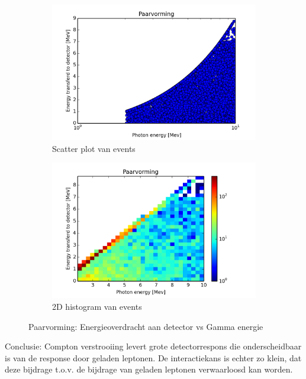 \documentclass[a4paper,11pt]{article}
\begin{document}
\begin{figure}[h]
        \begin{subfigure}[b]{0.6\textwidth}
                \includegraphics[width=1\textwidth]{fig-pair-scatter.png}
                \caption{Scatter plot van events}
                \label{fig:pair-scatter}
        \end{subfigure}
        \begin{subfigure}[b]{0.6\textwidth}
                \includegraphics[width=1\textwidth]{fig-pair-hist2d.png}
                \caption{2D histogram van events}
                \label{fig:pair-hist3d}
        \end{subfigure}
        \caption{Paarvorming: Energieoverdracht aan detector vs Gamma energie}\label{fig:pair}
\end{figure}

Conclusie: Compton verstrooiing levert grote detectorrespons die onderscheidbaar is van de response door geladen leptonen. De interactiekans is echter zo klein, dat deze bijdrage t.o.v. de bijdrage van geladen leptonen verwaarloosd kan worden.
\end{document}

